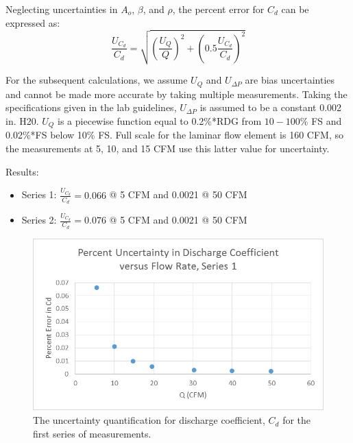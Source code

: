 \documentclass{article}
\begin{document}
Neglecting uncertainties in $A_o$, $\beta$, and $\rho$, the percent error for $C_d$ can be expressed as:
\begin{equation}
  \frac{U_{C_d}}{C_d} = \sqrt{ \left(\frac{U_{Q}}{Q}\right)^2 + \left( 0.5 \frac{U_{C_d}}{C_d} \right)^2}
\end{equation}

For the subsequent calculations, we assume $U_Q$ and $U_{\Delta P}$ are bias uncertainties and cannot be 
made more accurate by taking multiple measurements. Taking the specifications given in the lab 
guidelines, $U_{\Delta P}$ is assumed to be a constant 0.002 in. H20. $U_Q$ is a piecewise function equal to 
0.2\%*RDG from $10-100\%$ FS and 0.02\%*FS below 10\% FS. Full scale for the laminar flow element is 160 
CFM, so the measurements at 5, 10, and 15 CFM use this latter value for uncertainty.

Results: 
\begin{itemize}
\item Series 1: $\frac{U_{C_d}}{C_d} = 0.066$ @ 5 CFM and 0.0021 @ 50 CFM
\item Series 2: $\frac{U_{C_d}}{C_d} = 0.076$ @ 5 CFM and 0.0021 @ 50 CFM
\end{itemize}

  \begin{figure}[!htb]
   \begin{center}
    \includegraphics[width = 12 cm]{figs/PercentUncertaintyCdVsQ_Series1.jpg}
    \caption{The uncertainty quantification for discharge coefficient, $C_d$ for the first series of measurements.}
    \label{orif-s1}
   \end{center}
  \end{figure}
\end{document}
